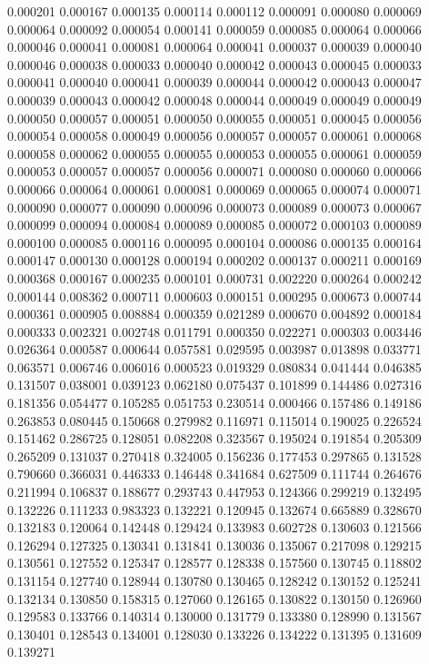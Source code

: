 0.000201
0.000167
0.000135
0.000114
0.000112
0.000091
0.000080
0.000069
0.000064
0.000092
0.000054
0.000141
0.000059
0.000085
0.000064
0.000066
0.000046
0.000041
0.000081
0.000064
0.000041
0.000037
0.000039
0.000040
0.000046
0.000038
0.000033
0.000040
0.000042
0.000043
0.000045
0.000033
0.000041
0.000040
0.000041
0.000039
0.000044
0.000042
0.000043
0.000047
0.000039
0.000043
0.000042
0.000048
0.000044
0.000049
0.000049
0.000049
0.000050
0.000057
0.000051
0.000050
0.000055
0.000051
0.000045
0.000056
0.000054
0.000058
0.000049
0.000056
0.000057
0.000057
0.000061
0.000068
0.000058
0.000062
0.000055
0.000055
0.000053
0.000055
0.000061
0.000059
0.000053
0.000057
0.000057
0.000056
0.000071
0.000080
0.000060
0.000066
0.000066
0.000064
0.000061
0.000081
0.000069
0.000065
0.000074
0.000071
0.000090
0.000077
0.000090
0.000096
0.000073
0.000089
0.000073
0.000067
0.000099
0.000094
0.000084
0.000089
0.000085
0.000072
0.000103
0.000089
0.000100
0.000085
0.000116
0.000095
0.000104
0.000086
0.000135
0.000164
0.000147
0.000130
0.000128
0.000194
0.000202
0.000137
0.000211
0.000169
0.000368
0.000167
0.000235
0.000101
0.000731
0.002220
0.000264
0.000242
0.000144
0.008362
0.000711
0.000603
0.000151
0.000295
0.000673
0.000744
0.000361
0.000905
0.008884
0.000359
0.021289
0.000670
0.004892
0.000184
0.000333
0.002321
0.002748
0.011791
0.000350
0.022271
0.000303
0.003446
0.026364
0.000587
0.000644
0.057581
0.029595
0.003987
0.013898
0.033771
0.063571
0.006746
0.006016
0.000523
0.019329
0.080834
0.041444
0.046385
0.131507
0.038001
0.039123
0.062180
0.075437
0.101899
0.144486
0.027316
0.181356
0.054477
0.105285
0.051753
0.230514
0.000466
0.157486
0.149186
0.263853
0.080445
0.150668
0.279982
0.116971
0.115014
0.190025
0.226524
0.151462
0.286725
0.128051
0.082208
0.323567
0.195024
0.191854
0.205309
0.265209
0.131037
0.270418
0.324005
0.156236
0.177453
0.297865
0.131528
0.790660
0.366031
0.446333
0.146448
0.341684
0.627509
0.111744
0.264676
0.211994
0.106837
0.188677
0.293743
0.447953
0.124366
0.299219
0.132495
0.132226
0.111233
0.983323
0.132221
0.120945
0.132674
0.665889
0.328670
0.132183
0.120064
0.142448
0.129424
0.133983
0.602728
0.130603
0.121566
0.126294
0.127325
0.130341
0.131841
0.130036
0.135067
0.217098
0.129215
0.130561
0.127552
0.125347
0.128577
0.128338
0.157560
0.130745
0.118802
0.131154
0.127740
0.128944
0.130780
0.130465
0.128242
0.130152
0.125241
0.132134
0.130850
0.158315
0.127060
0.126165
0.130822
0.130150
0.126960
0.129583
0.133766
0.140314
0.130000
0.131779
0.133380
0.128990
0.131567
0.130401
0.128543
0.134001
0.128030
0.133226
0.134222
0.131395
0.131609
0.139271

